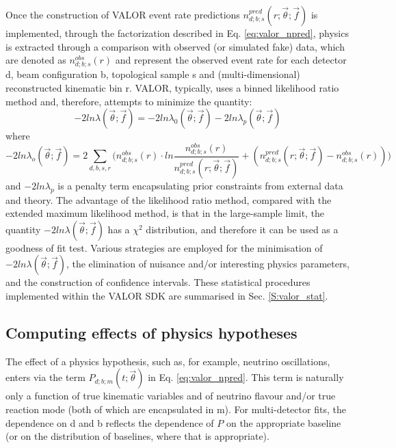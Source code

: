 Once the construction of VALOR event rate predictions $n_{d;b;s}^{pred}(r; \vec{\theta}; \vec{f})$ is implemented, through the factorization described in 
Eq. \ref{eq:valor_npred}, physics is extracted through a comparison with 
observed (or simulated fake) data, which are denoted as $n_{d;b;s}^{obs}(r)$
and represent the observed event rate
for each detector d, beam configuration b, topological sample s
and (multi-dimensional) reconstructed kinematic bin r.
VALOR, typically, uses a binned likelihood ratio method and, therefore,
attempts to minimize the quantity:
\begin{equation}
 -2 ln\lambda(\vec{\theta}; \vec{f}) = 
    -2 ln\lambda_{0}(\vec{\theta}; \vec{f}) 
    -2 ln\lambda_{p}(\vec{\theta}; \vec{f})
\label{eq:valor_likelihood_ratio}
\end{equation}
where 
\begin{equation}
 -2 ln\lambda_{o}(\vec{\theta}; \vec{f}) = 2 \sum_{d,b,s,r}
    \Big( 
       n_{d;b;s}^{obs}(r) \cdot
         ln \frac{n_{d;b;s}^{obs}(r)}{n_{d;b;s}^{pred}(r; \vec{\theta}; \vec{f})} 
       + (n_{d;b;s}^{pred}(r; \vec{\theta}; \vec{f}) - n_{d;b;s}^{obs}(r))
    \Big) 
\label{eq:valor_likelihood_ratio_data}
\end{equation}
and $-2 ln\lambda_{p}$ is a penalty term encapsulating prior constraints
from external data and theory.
The advantage of the likelihood ratio method, 
compared with the extended maximum likelihood method, is that in the
large-sample limit, the quantity $-2 ln\lambda(\vec{\theta}; \vec{f})$
has a $\chi^2$ distribution, and therefore it can be used as a goodness of fit test.
Various strategies are employed for the minimisation of 
$-2 ln\lambda(\vec{\theta}; \vec{f})$, the elimination of nuisance and/or
interesting physics parameters, and the construction of confidence intervals.
These statistical procedures implemented within the VALOR SDK are
summarised in Sec. \ref{S:valor_stat}.


\subsection{Computing effects of physics hypotheses}

The effect of a physics hypothesis, such as, for example, neutrino oscillations,
enters via the term $P_{d;b;m}(t; \vec{\theta})$ in Eq. \ref{eq:valor_npred}.
This term is naturally only a function of true 
kinematic variables and of neutrino flavour and/or true reaction mode 
(both of which are encapsulated in m). For multi-detector fits, 
the dependence on d and b reflects the dependence of $P$ on the appropriate 
baseline (or on the distribution of  baselines, where that is appropriate).

